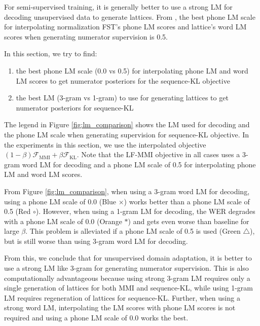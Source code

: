\documentclass{article}
\newcommand{\Fkl}{\mathcal{F}_\text{KL}}
\newcommand{\Fmmi}{\mathcal{F}_\text{MMI}}
\begin{document}

For semi-supervised training, it is generally better to use a strong LM
for decoding unsupervised data to generate lattices.
From \cite{manohar2018semisup}, the best phone LM scale for interpolating 
normalization FST's phone LM scores and lattice's word LM scores 
when generating numerator supervision is 0.5.

In this section, we try to find:
\begin{enumerate}
  \item the best phone LM scale (0.0 vs 0.5) for interpolating phone LM and
    word LM scores to get numerator posteriors for the sequence-KL objective
  \item the best LM (3-gram vs 1-gram) to use for generating lattices to get
    numerator posteriors for sequence-KL
\end{enumerate}

The legend in Figure \ref{fig:lm_comparison} shows the LM used for decoding 
and the phone LM scale when generating supervision for sequence-KL objective. 
In the experiments in this section, we use the interpolated objective 
$(1-\beta)\Fmmi + \beta\Fkl$. 
Note that the LF-MMI objective in all cases uses a 3-gram word LM for decoding
and a phone LM scale of 0.5 for interpolating phone LM and word LM scores.

From Figure \ref{fig:lm_comparison}, when using a 3-gram word LM for 
decoding, using a phone LM scale of 0.0 (Blue $\times$) works better 
than a phone LM scale of 0.5 (Red $\circ$).
However, when using a 1-gram LM for decoding, the WER degrades with a phone LM
scale of 0.0 (Orange $*$) and gets even worse than baseline for large $\beta$.
This problem is alleviated if a phone LM scale of 0.5 is used (Green
$\triangle$), but is still worse than using 3-gram word LM for decoding.

From this, we conclude that for unsupervised domain adaptation, it is
better to use a strong LM like 3-gram for generating numerator supervision. 
This is also computationally advantageous
because using strong 3-gram LM requires only a single generation of lattices for
both MMI and sequence-KL, while using 1-gram LM requires regeneration of
lattices for sequence-KL.
Further, when using a strong word LM, interpolating the LM scores with 
phone LM scores is not required and using a phone LM scale of 0.0 works the
best.
\end{document}
